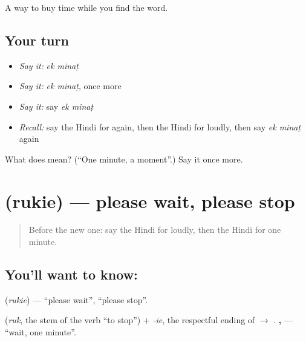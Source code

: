 \begin{grammarlens}[title={What you've built}]
A way to buy time while you find the word.
\end{grammarlens}

\subsection*{Your turn}
\begin{itemize}
\raggedright
  \item \emph{Say it:} \emph{ek minaṭ}
  \item \emph{Say it:} \emph{ek minaṭ}, once more
  \item \emph{Say it:} say \emph{ek minaṭ}
  \item \emph{Recall:} say the Hindi for again, then the Hindi for loudly, then say \emph{ek minaṭ} again
\end{itemize}

\begin{tcolorbox}[breakable,colback=teal!4,colframe=teal!35!black,title={Before you move on}]
What does   mean? (\textquotedblleft{}One minute, a moment\textquotedblright{}.) Say it once more.
\end{tcolorbox}
\section[\texorpdfstring{\hi{रुकिए} (rukie)}{रुकिए (rukie)}]{ (rukie) — please wait, please stop}

\label{lesson:HI-C110-rukie}



\begin{quote}
Before the new one: say the Hindi for loudly, then the Hindi for one minute.
\end{quote}

\subsection*{You'll want to know: }
\textbf{} (\emph{rukie}) — \textquotedblleft{}please wait\textquotedblright{}, \textquotedblleft{}please stop\textquotedblright{}.

\textbf{} (\emph{ruk}, the stem of the verb \textquotedblleft{}to stop\textquotedblright{}) + \emph{-ie}, the respectful ending of \textbf{} $\to$ \textbf{}. \textbf{,  } — \textquotedblleft{}wait, one minute\textquotedblright{}.


